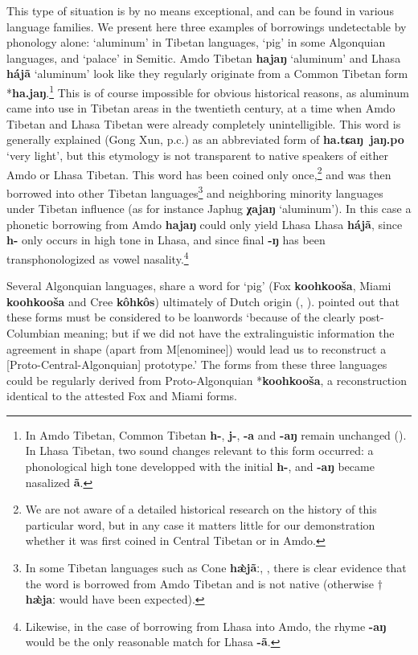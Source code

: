 \documentclass[svgnames,12pt]{scrartcl}
\newcommand{\ipa}[1]{\textbf{{\phon\mbox{#1}}}}
\begin{document}
{{This type of situation is by no means exceptional, and can be found in various language families. We present here three examples of borrowings undetectable by phonology alone: `aluminum' in Tibetan languages, `pig' in some Algonquian languages, and `palace' in Semitic. 
Amdo Tibetan \ipa{hajaŋ} `aluminum' and Lhasa \ipa{hájã} `aluminum' look like they regularly originate from a Common Tibetan form *\ipa{ha.jaŋ}.\footnote{In Amdo Tibetan, Common Tibetan \ipa{h-}, \ipa{j-}, \ipa{-a} and \ipa{-aŋ} remain unchanged (\citealt{gong16amdo}). In Lhasa Tibetan, two sound changes relevant to this form occurred: a phonological high tone developped with the initial \ipa{h-}, and \ipa{-aŋ} became nasalized \ipa{ã}.} This is of course impossible for obvious historical reasons, as aluminum came into use in Tibetan areas in the twentieth century, at a time when Amdo Tibetan and Lhasa Tibetan were already completely unintelligible. This word is generally explained (Gong Xun, p.c.) as an abbreviated form of \ipa{ha.tɕaŋ jaŋ.po} `very light', but this etymology is not transparent to native speakers of either Amdo or Lhasa Tibetan. This word has been coined only once,\footnote{We are not aware of a detailed historical research on the history of this particular word, but in any case it matters little for our demonstration whether it was first coined in Central Tibetan or in Amdo.} and was then borrowed into other Tibetan languages\footnote{In some Tibetan languages such as Cone \ipa{hæ̀jãː}, \citet[306]{jacques14cone}, there is clear evidence that the word is borrowed from Amdo Tibetan and is not native (otherwise $\dagger$\ipa{hæ̀jaː} would have been expected). } and neighboring minority languages under Tibetan influence (as for instance Japhug \ipa{χajaŋ} `aluminum').
In this case a phonetic borrowing from Amdo \ipa{hajaŋ} could only yield Lhasa Lhasa \ipa{hájã}, since \ipa{h-} only occurs in high tone in Lhasa, and since final \ipa{-ŋ} has been transphonologized as vowel nasality.\footnote{Likewise, in the case of borrowing from Lhasa into Amdo, the rhyme \ipa{-aŋ} would be the only reasonable match for Lhasa \ipa{-ã}.} 

Several Algonquian languages, share a word for `pig' (Fox \ipa{koohkooša}, Miami \ipa{koohkooša} and Cree \ipa{kôhkôs}) ultimately of Dutch origin (\citealt{goddard74dutch}, \citealt{costa13borrowing}). \citet[266]{hockett57k} pointed out that these forms must be considered to be loanwords `because of the clearly post-Columbian meaning; but if we did not have the extralinguistic information the agreement in shape (apart from M[enominee]) would lead us to reconstruct a [Proto-Central-Algonquian] prototype.' The forms from these three languages could be regularly derived from Proto-Algonquian *\ipa{koohkooša}, a reconstruction identical to the attested Fox and Miami forms.

}}
\end{document}

